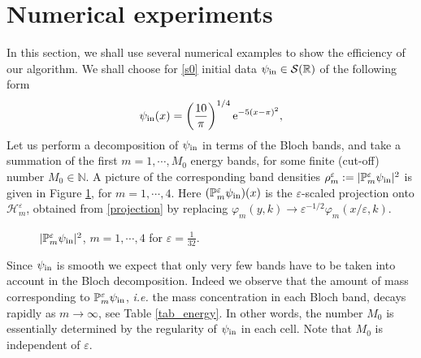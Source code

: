 \documentclass[leqno,final]{siamltex}
\numberwithin{equation}{section}
\newcounter{me}
\begin{document}
\section {Numerical experiments}\label{NUM}
In this section, we shall use several numerical examples to show
the efficiency of our algorithm. We shall choose for \eqref{s0}
initial data $\psi_{\rm in} \in \mathcal S({{\mathbb R}})$ of the following
form \begin{equation}\label{ex0} \psi_{\rm in}(x)=
\left({\frac{{10}}{{\pi}}}\right)^{1/4}{\mathrm{e}}^{-5(x-\pi)^2}, \end{equation} Let us
perform a decomposition of $\psi_{\rm in}$ in terms of the Bloch
bands, and take a summation of the first $m= 1,\cdots, M_0$ energy
bands, for some finite (cut-off) number $M_0\in {{\mathbb N }}$. A picture of
the corresponding band densities $\rho_m^{{\varepsilon }}:= |\mathbb P^{{\varepsilon }}_m
\psi_{\rm in}|^2$ is given in Figure \ref{fig:energy}, for
$m=1,\cdots,4$. Here $(\mathbb P^{{\varepsilon }}_m \psi_{\rm in})(x)$ is the
${{\varepsilon }}$-scaled projection onto $\mathcal H_m^{{\varepsilon }}$, obtained from
\eqref{projection} by replacing ${\varphi}_m(y,k)\to {{\varepsilon }}^{-1/2} {\varphi}_m(x/
{{\varepsilon }},k)$.
\begin{figure} 
\begin{center}\footnotesize
{}\vspace{-2mm}
\end{center}
\caption{$|\mathbb P^{{\varepsilon }}_m \psi_{\rm in}|^2$, $m=1,\cdots,4$ for
${{\varepsilon }}={\frac{{1}}{{32}}}$.} \label{fig:energy}\vspace{2mm}
\end{figure}
Since $\psi_{\rm in}$ is smooth we expect that only very few bands
have to be taken into account in the Bloch decomposition. Indeed
we observe that the amount of mass corresponding to $\mathbb
P^{{\varepsilon }}_m \psi_{\rm in}$, {{\sl i.e.\/ }} the mass concentration in each Bloch
band, decays rapidly as $m \to \infty$, see Table
\ref{tab_energy}. In other words, the number $M_0$ is essentially
determined by the regularity of $\psi_{\rm in}$ in each cell. Note
that $M_0$ is independent of ${{\varepsilon }}$.
\end{document}
